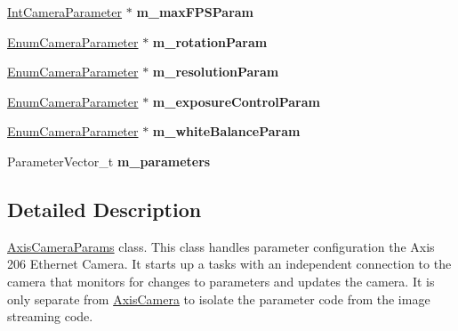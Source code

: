 \begin{DoxyCompactItemize}
\item 
\hypertarget{classAxisCameraParams_af008f92f88afb5dfad929d373a303ee1}{
\hyperlink{classIntCameraParameter}{IntCameraParameter} $\ast$ {\bfseries m\_\-maxFPSParam}}
\label{classAxisCameraParams_af008f92f88afb5dfad929d373a303ee1}

\item 
\hypertarget{classAxisCameraParams_a9960bf68e4e87de1c32469331afad393}{
\hyperlink{classEnumCameraParameter}{EnumCameraParameter} $\ast$ {\bfseries m\_\-rotationParam}}
\label{classAxisCameraParams_a9960bf68e4e87de1c32469331afad393}

\item 
\hypertarget{classAxisCameraParams_a165e64fcc5194e04cd632d1a39403d1b}{
\hyperlink{classEnumCameraParameter}{EnumCameraParameter} $\ast$ {\bfseries m\_\-resolutionParam}}
\label{classAxisCameraParams_a165e64fcc5194e04cd632d1a39403d1b}

\item 
\hypertarget{classAxisCameraParams_afa3b2d103987aff5c6e897ca7dc1dd96}{
\hyperlink{classEnumCameraParameter}{EnumCameraParameter} $\ast$ {\bfseries m\_\-exposureControlParam}}
\label{classAxisCameraParams_afa3b2d103987aff5c6e897ca7dc1dd96}

\item 
\hypertarget{classAxisCameraParams_a81de1ce026ef6f19f1cf55473f569e47}{
\hyperlink{classEnumCameraParameter}{EnumCameraParameter} $\ast$ {\bfseries m\_\-whiteBalanceParam}}
\label{classAxisCameraParams_a81de1ce026ef6f19f1cf55473f569e47}

\item 
\hypertarget{classAxisCameraParams_af7251b0b481fd7305d5e7a2fc63e94bc}{
ParameterVector\_\-t {\bfseries m\_\-parameters}}
\label{classAxisCameraParams_af7251b0b481fd7305d5e7a2fc63e94bc}

\end{DoxyCompactItemize}


\subsection{Detailed Description}
\hyperlink{classAxisCameraParams}{AxisCameraParams} class. This class handles parameter configuration the Axis 206 Ethernet Camera. It starts up a tasks with an independent connection to the camera that monitors for changes to parameters and updates the camera. It is only separate from \hyperlink{classAxisCamera}{AxisCamera} to isolate the parameter code from the image streaming code. 

